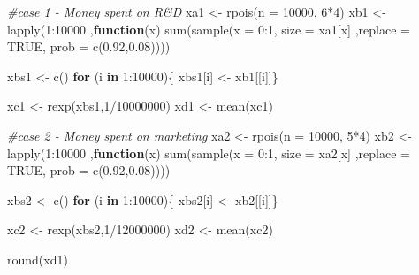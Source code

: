 \documentclass[
]{article}
\newenvironment{Shaded}{\begin{snugshade}}{\end{snugshade}}
\newcommand{\AttributeTok}[1]{\textcolor[rgb]{0.77,0.63,0.00}{#1}}
\newcommand{\CommentTok}[1]{\textcolor[rgb]{0.56,0.35,0.01}{\textit{#1}}}
\newcommand{\ConstantTok}[1]{\textcolor[rgb]{0.00,0.00,0.00}{#1}}
\newcommand{\ControlFlowTok}[1]{\textcolor[rgb]{0.13,0.29,0.53}{\textbf{#1}}}
\newcommand{\DecValTok}[1]{\textcolor[rgb]{0.00,0.00,0.81}{#1}}
\newcommand{\FloatTok}[1]{\textcolor[rgb]{0.00,0.00,0.81}{#1}}
\newcommand{\FunctionTok}[1]{\textcolor[rgb]{0.00,0.00,0.00}{#1}}
\newcommand{\NormalTok}[1]{#1}
\newcommand{\OtherTok}[1]{\textcolor[rgb]{0.56,0.35,0.01}{#1}}
\newcommand{\SpecialCharTok}[1]{\textcolor[rgb]{0.00,0.00,0.00}{#1}}
\begin{document}
\begin{Shaded}
\begin{Highlighting}[]
\CommentTok{\#case 1 {-} Money spent on R\&D}
\NormalTok{xa1 }\OtherTok{\textless{}{-}} \FunctionTok{rpois}\NormalTok{(}\AttributeTok{n =} \DecValTok{10000}\NormalTok{, }\DecValTok{6}\SpecialCharTok{*}\DecValTok{4}\NormalTok{)}
\NormalTok{xb1 }\OtherTok{\textless{}{-}} \FunctionTok{lapply}\NormalTok{(}\DecValTok{1}\SpecialCharTok{:}\DecValTok{10000}\NormalTok{ ,}\ControlFlowTok{function}\NormalTok{(x) }\FunctionTok{sum}\NormalTok{(}\FunctionTok{sample}\NormalTok{(}\AttributeTok{x =} \DecValTok{0}\SpecialCharTok{:}\DecValTok{1}\NormalTok{, }\AttributeTok{size =}\NormalTok{ xa1[x] ,}\AttributeTok{replace =} \ConstantTok{TRUE}\NormalTok{, }\AttributeTok{prob =} \FunctionTok{c}\NormalTok{(}\FloatTok{0.92}\NormalTok{,}\FloatTok{0.08}\NormalTok{))))}

\NormalTok{xbs1 }\OtherTok{\textless{}{-}} \FunctionTok{c}\NormalTok{()}
\ControlFlowTok{for}\NormalTok{ (i }\ControlFlowTok{in} \DecValTok{1}\SpecialCharTok{:}\DecValTok{10000}\NormalTok{)\{}
\NormalTok{  xbs1[i] }\OtherTok{\textless{}{-}}\NormalTok{ xb1[[i]]\}}

\NormalTok{xc1 }\OtherTok{\textless{}{-}} \FunctionTok{rexp}\NormalTok{(xbs1,}\DecValTok{1}\SpecialCharTok{/}\DecValTok{10000000}\NormalTok{)}
\NormalTok{xd1 }\OtherTok{\textless{}{-}} \FunctionTok{mean}\NormalTok{(xc1)}

\CommentTok{\#case 2 {-} Money spent on marketing}
\NormalTok{xa2 }\OtherTok{\textless{}{-}} \FunctionTok{rpois}\NormalTok{(}\AttributeTok{n =} \DecValTok{10000}\NormalTok{, }\DecValTok{5}\SpecialCharTok{*}\DecValTok{4}\NormalTok{)}
\NormalTok{xb2 }\OtherTok{\textless{}{-}} \FunctionTok{lapply}\NormalTok{(}\DecValTok{1}\SpecialCharTok{:}\DecValTok{10000}\NormalTok{ ,}\ControlFlowTok{function}\NormalTok{(x) }\FunctionTok{sum}\NormalTok{(}\FunctionTok{sample}\NormalTok{(}\AttributeTok{x =} \DecValTok{0}\SpecialCharTok{:}\DecValTok{1}\NormalTok{, }\AttributeTok{size =}\NormalTok{ xa2[x] ,}\AttributeTok{replace =} \ConstantTok{TRUE}\NormalTok{, }\AttributeTok{prob =} \FunctionTok{c}\NormalTok{(}\FloatTok{0.92}\NormalTok{,}\FloatTok{0.08}\NormalTok{))))}

\NormalTok{xbs2 }\OtherTok{\textless{}{-}} \FunctionTok{c}\NormalTok{()}
\ControlFlowTok{for}\NormalTok{ (i }\ControlFlowTok{in} \DecValTok{1}\SpecialCharTok{:}\DecValTok{10000}\NormalTok{)\{}
\NormalTok{  xbs2[i] }\OtherTok{\textless{}{-}}\NormalTok{ xb2[[i]]\}}

\NormalTok{xc2 }\OtherTok{\textless{}{-}} \FunctionTok{rexp}\NormalTok{(xbs2,}\DecValTok{1}\SpecialCharTok{/}\DecValTok{12000000}\NormalTok{)}
\NormalTok{xd2 }\OtherTok{\textless{}{-}} \FunctionTok{mean}\NormalTok{(xc2)}

\FunctionTok{round}\NormalTok{(xd1) }
\end{Highlighting}
\end{Shaded}
\end{document}
